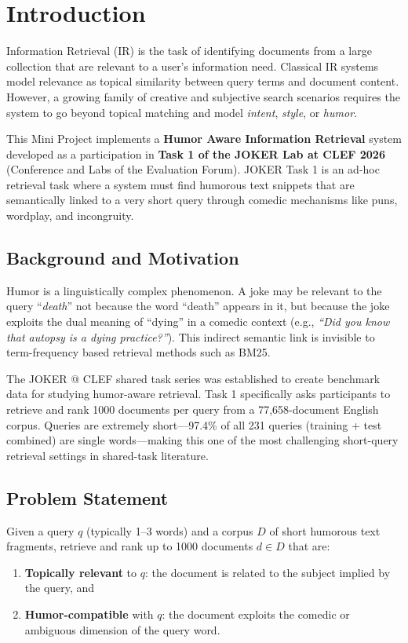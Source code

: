 \chapter{Introduction}
\justify

Information Retrieval (IR) is the task of identifying documents from a large collection that are relevant to a user's information need. Classical IR systems model relevance as topical similarity between query terms and document content. However, a growing family of creative and subjective search scenarios requires the system to go beyond topical matching and model \textit{intent}, \textit{style}, or \textit{humor}.

This Mini Project implements a \textbf{Humor Aware Information Retrieval} system developed as a participation in \textbf{Task 1 of the JOKER Lab at CLEF 2026} (Conference and Labs of the Evaluation Forum). JOKER Task 1 is an ad-hoc retrieval task where a system must find humorous text snippets that are semantically linked to a very short query through comedic mechanisms like puns, wordplay, and incongruity.

\section{Background and Motivation}

Humor is a linguistically complex phenomenon. A joke may be relevant to the query ``\textit{death}'' not because the word ``death'' appears in it, but because the joke exploits the dual meaning of ``dying'' in a comedic context (e.g., \textit{``Did you know that autopsy is a dying practice?''}). This indirect semantic link is invisible to term-frequency based retrieval methods such as BM25.

The JOKER @ CLEF shared task series was established to create benchmark data for studying humor-aware retrieval. Task 1 specifically asks participants to retrieve and rank 1000 documents per query from a 77,658-document English corpus. Queries are extremely short---97.4\% of all 231 queries (training + test combined) are single words---making this one of the most challenging short-query retrieval settings in shared-task literature.

\section{Problem Statement}

Given a query $q$ (typically 1--3 words) and a corpus $D$ of short humorous text fragments, retrieve and rank up to 1000 documents $d \in D$ that are:
\begin{enumerate}
    \item \textbf{Topically relevant} to $q$: the document is related to the subject implied by the query, and
    \item \textbf{Humor-compatible} with $q$: the document exploits the comedic or ambiguous dimension of the query word.
\end{enumerate}

